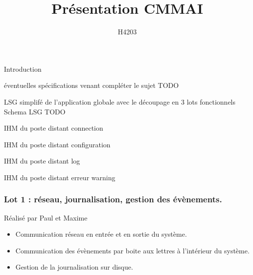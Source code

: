 \documentclass{beamer}
\title{Présentation CMMAI}
\author{H4203} %
\begin{document}
\begin{frame}
\titlepage
\end{frame}

\begin{frame}
Introduction
\end{frame}

\begin{frame}
éventuelles spécifications venant compléter le sujet
TODO
\end{frame}

\begin{frame}
LSG simplifé de l'application globale avec le découpage en 3 lots fonctionnels
Schema LSG TODO
\end{frame}

\begin{frame}
IHM du poste distant
connection
\end{frame}

\begin{frame}
IHM du poste distant
configuration
\end{frame}

\begin{frame}
IHM du poste distant
log
\end{frame}

\begin{frame}
IHM du poste distant
erreur \/ warning
\end{frame}

\begin{frame}
\frametitle{Lot 1 : réseau, journalisation, gestion des évènements.}
    \begin{block}{Réalisé par Paul et Maxime}
	\begin{itemize}
	    \item   Communication réseau en entrée et en sortie du système.
	    \item   Communication des évènements par boite aux lettres à
	    l'intérieur du système.
	    \item   Gestion de la journalisation sur disque.
	\end{itemize}
    \end{block}
\end{frame}
\end{document}
